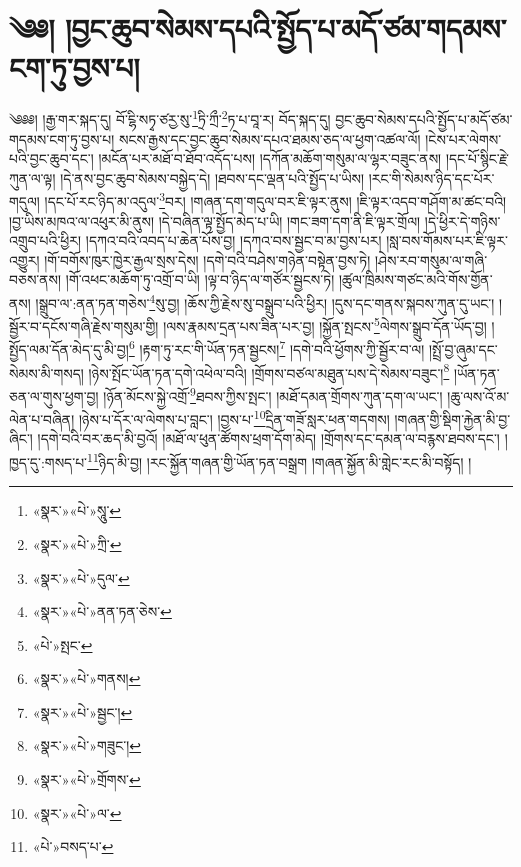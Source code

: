 \chapter{༄༅། །བྱང་ཆུབ་སེམས་དཔའི་སྤྱོད་པ་མདོ་ཙམ་གདམས་ངག་ཏུ་བྱས་པ།}༄༅༅། །རྒྱ་གར་སྐད་དུ། བོ་ངྷི་སཏྭ་ཙརྱ་སུ་\footnote{«སྣར་»«པེ་»སཱུ་}ཏྲི་ཀྲྀ་\footnote{«སྣར་»«པེ་»ཀྲི་}ཏ་པ་བཱ་ར། བོད་སྐད་དུ། བྱང་ཆུབ་སེམས་དཔའི་སྤྱོད་པ་མདོ་ཙམ་གདམས་ངག་ཏུ་བྱས་པ། སངས་རྒྱས་དང་བྱང་ཆུབ་སེམས་དཔའ་ཐམས་ཅད་ལ་ཕྱག་འཚལ་ལོ། །ངེས་པར་ལེགས་པའི་བྱང་ཆུབ་དང་། །མངོན་པར་མཐོ་བ་ཐོབ་འདོད་པས། །དཀོན་མཆོག་གསུམ་ལ་ལྷར་བཟུང་ནས། །དང་པོ་སྙིང་རྗེ་ཀུན་ལ་ལྟ། །དེ་ནས་བྱང་ཆུབ་སེམས་བསྐྱེད་དེ། །ཐབས་དང་ལྡན་པའི་སྤྱོད་པ་ཡིས། །རང་གི་སེམས་ཉིད་དང་པོར་གདུལ། །དང་པོ་རང་ཉིད་མ་འདུལ་\footnote{«སྣར་»«པེ་»དུལ་}བར། །གཞན་དག་གདུལ་བར་ཇི་ལྟར་ནུས། །ཇི་ལྟར་འདབ་གཤོག་མ་ཚང་བའི། །བྱ་ཡིས་མཁའ་ལ་འཕུར་མི་ནུས། །དེ་བཞིན་ལྟ་སྤྱོད་མེད་པ་ཡི། །གང་ཟག་དག་ནི་ཇི་ལྟར་གྲོལ། །དེ་ཕྱིར་དེ་གཉིས་འགྲུབ་པའི་ཕྱིར། །དཀའ་བའི་འབད་པ་ཆེན་པོས་བྱ། །དཀའ་བས་སྦྱང་བ་མ་བྱས་པར། །སླ་བས་གོམས་པར་ཇི་ལྟར་འགྱུར། །གོ་བགོས་ཁུར་ཁྱེར་རྒྱལ་སྲས་དེས། །དགེ་བའི་བཤེས་གཉེན་བསྟེན་བྱས་ཏེ། །ཤེས་རབ་གསུམ་ལ་གཞི་བཅས་ནས། །གོ་འཕང་མཆོག་ཏུ་འགྲོ་བ་ཡི། །ལྟ་བ་ཉིད་ལ་གཙོར་སྦྱངས་ཏེ། །ཚུལ་ཁྲིམས་གཙང་མའི་གོས་གྱོན་ནས། །སྒྲུབ་ལ་:ནན་ཏན་གཅེས་\footnote{«སྣར་»«པེ་»ནན་ཏན་ཅེས་}སུ་བྱ། །ཆོས་ཀྱི་རྗེས་སུ་བསྒྲུབ་པའི་ཕྱིར། །དུས་དང་གནས་སྐབས་ཀུན་དུ་ཡང་། །སྦྱོར་བ་དངོས་གཞི་རྗེས་གསུམ་གྱི། །ལས་རྣམས་དྲན་པས་ཟིན་པར་བྱ། །སྐྱོན་སྤངས་\footnote{«པེ་»སྤང་}ལེགས་སྒྲུབ་དོན་ཡོད་བྱ། །སྤྱོད་ལམ་དོན་མེད་དུ་མི་བྱ།\footnote{«སྣར་»«པེ་»གནས།} །རྟག་ཏུ་རང་གི་ཡོན་ཏན་སྦྱངས།\footnote{«སྣར་»«པེ་»སྦྱང་།} །དགེ་བའི་ཕྱོགས་ཀྱི་སྦྱོར་བ་ལ། །སྤྲོ་བྱ་ཞུམ་དང་སེམས་མི་གསད། །ཉེས་སྤོང་ཡོན་ཏན་དགེ་འཕེལ་བའི། །གྲོགས་བཙལ་མཐུན་པས་དེ་སེམས་བཟུང་།\footnote{«སྣར་»«པེ་»གཟུང་།} །ཡོན་ཏན་ཅན་ལ་གུས་ཕྱག་བྱ། །ཉོན་མོངས་སྐྱེ་འགྲོ་\footnote{«སྣར་»«པེ་»གྲོགས་}ཐབས་ཀྱིས་སྤང་། །མཐོ་དམན་གྲོགས་ཀུན་དག་ལ་ཡང་། །ཆུ་ལས་འོ་མ་ལེན་པ་བཞིན། །ཉེས་པ་དོར་ལ་ལེགས་པ་བླང་། །བྱས་པ་\footnote{«སྣར་»«པེ་»ལ་}དྲིན་གཟོ་སླར་ཕན་གདགས། །གཞན་གྱི་སྡིག་རྐྱེན་མི་བྱ་ཞིང་། །དགེ་བའི་བར་ཆད་མི་བྱའོ། །མཐོ་ལ་ཕུན་ཚོགས་ཕྲག་དོག་མེད། །གྲོགས་དང་དམན་ལ་བརྙས་ཐབས་དང་། །ཁྱད་དུ་:གསད་པ་\footnote{«པེ་»བསད་པ་}ཉིད་མི་བྱ། །རང་སྐྱོན་གཞན་གྱི་ཡོན་ཏན་བསྒྲག །གཞན་སྐྱོན་མི་གླེང་རང་མི་བསྟོད། །
